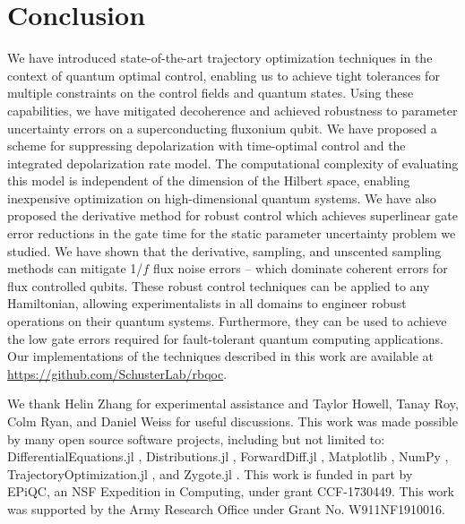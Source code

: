 \documentclass[
  amsfonts,
  amsmath,
  amssymb,
  pra,
  twocolumn,
  superscriptaddress,
]{revtex4-2}
\begin{document}
\section{Conclusion}
We have introduced state-of-the-art trajectory optimization
techniques in the context of quantum optimal control, enabling
us to achieve tight tolerances for multiple constraints on the
control fields and quantum states. Using these capabilities,
we have mitigated decoherence and
achieved robustness to parameter uncertainty
errors on a superconducting fluxonium qubit.
We have proposed a scheme for suppressing
depolarization with time-optimal
control and the integrated depolarization rate model.
The computational complexity of evaluating this model is
independent of the dimension of the Hilbert space, enabling
inexpensive optimization on high-dimensional quantum systems.
We have also proposed the derivative method for robust control which achieves
superlinear gate error reductions in the gate time for the static parameter
uncertainty problem we studied.
We have shown that the derivative, sampling, and unscented sampling methods
can mitigate 1/$f$ flux noise errors -- which
dominate coherent errors for flux controlled qubits.
These robust control techniques can be applied
to any Hamiltonian,
allowing experimentalists in all domains to engineer robust
operations on their quantum systems.
Furthermore, they can be used to achieve the low gate errors
required for fault-tolerant quantum computing applications. Our
implementations of the techniques described in this work are available
at \url{https://github.com/SchusterLab/rbqoc}.

\begin{acknowledgments}
  We thank Helin Zhang for experimental assistance
  and Taylor Howell, Tanay Roy, Colm Ryan, and Daniel Weiss for useful discussions.
  This work was made possible by many open source software projects,
  including but not limited to:
  DifferentialEquations.jl \cite{rackauckas2017differentialequations},
  Distributions.jl \cite{besancon2019distributions},
  ForwardDiff.jl \cite{revelsLubinPapamarkou2016},
  Matplotlib \cite{hunter2007matplotlib},
  NumPy \cite{harris2020array},
  TrajectoryOptimization.jl \cite{howell2019altro},
  and Zygote.jl \cite{innes2018don}.
  This work is funded in part by EPiQC, an NSF Expedition in Computing, under grant CCF-1730449.
  This work was supported by the Army Research Office under Grant No. W911NF1910016.
\end{acknowledgments}

\appendix
\end{document}

